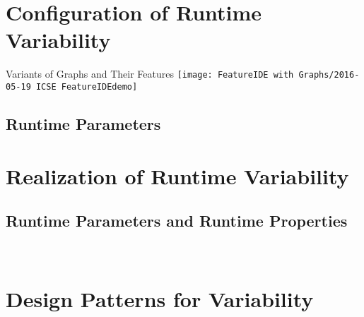 \documentclass[
	aspectratio=169, %
	8pt, %
	handout, %
]{beamer}
\subtitle{2. Runtime Variability and Design Patterns}
\author{Timo Kehrer}
\begin{document}



\section{Configuration of Runtime Variability}

\begin{frame}{Variants of Graphs and Their Features}
	\centering
	\texttt{[image: FeatureIDE with Graphs/2016-05-19 ICSE FeatureIDEdemo]}
\end{frame}

\subsection{Runtime Parameters}
\begin{frame}{\insertsubsection}
\end{frame}

\lessonslearned{
	\item \ldots
}{
	\item \ldots
}{
	\ldots
}

\sectionend

\section{Realization of Runtime Variability}

\subsection{Runtime Parameters and Runtime Properties}
\begin{frame}{\insertsubsection\ \mytitlesource{\featureide}}
\end{frame}

\lessonslearned{
	\item \ldots
}{
	\item \ldots
}{
	\ldots
}

\sectionend

\section{Design Patterns for Variability}



\lessonslearned{
	\item \ldots
}{
	\item \ldots
}{
	\ldots
}


\end{document}
